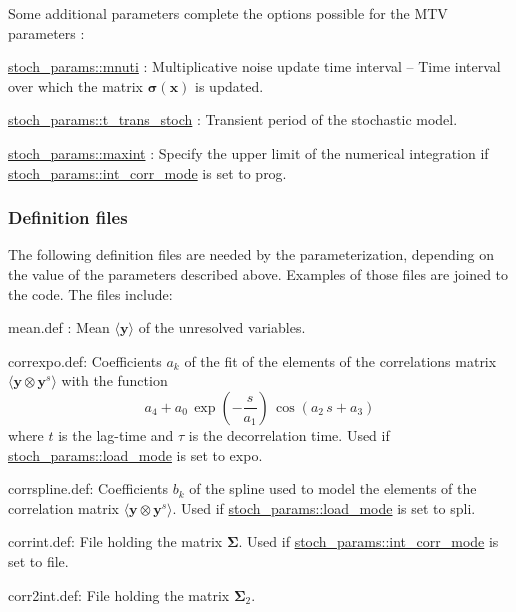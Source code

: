 Some additional parameters complete the options possible for the M\+TV parameters \+:
\begin{DoxyItemize}
\item \hyperlink{namespacestoch__params_ab0b8df90daf320dc4f5810eacd7d93e7}{stoch\+\_\+params\+::mnuti} \+: Multiplicative noise update time interval -- Time interval over which the matrix $\boldsymbol\sigma(\boldsymbol x)$ is updated.
\item \hyperlink{namespacestoch__params_a11aa6b888c2b4005aca690fb78e2c785}{stoch\+\_\+params\+::t\+\_\+trans\+\_\+stoch} \+: Transient period of the stochastic model.
\item \hyperlink{namespacestoch__params_a50976593e79387f25e08fef6ce56b30b}{stoch\+\_\+params\+::maxint} \+: Specify the upper limit of the numerical integration if \hyperlink{namespacestoch__params_ab901db3992a4df88db5a67fdd7be6ac6}{stoch\+\_\+params\+::int\+\_\+corr\+\_\+mode} is set to \textquotesingle{}prog\textquotesingle{}.
\end{DoxyItemize}

\subsubsection*{Definition files}

The following definition files are needed by the parameterization, depending on the value of the parameters described above. Examples of those files are joined to the code. The files include\+:
\begin{DoxyItemize}
\item \textquotesingle{}mean.\+def\textquotesingle{} \+: Mean $\langle \boldsymbol y \rangle$ of the unresolved variables.
\item \textquotesingle{}correxpo.\+def\textquotesingle{}\+: Coefficients $a_k$ of the fit of the elements of the correlations matrix $\langle \boldsymbol y \otimes \boldsymbol y^s \rangle$ with the function \[ a_4+a_0 \, \exp\left(-\frac{s}{a_1}\right) \, \cos(a_2 \, s + a_3) \] where $t$ is the lag-\/time and $\tau$ is the decorrelation time. Used if \hyperlink{namespacestoch__params_ac61a48744a1bb015b5148c421837fbe7}{stoch\+\_\+params\+::load\+\_\+mode} is set to \textquotesingle{}expo\textquotesingle{}.
\item \textquotesingle{}corrspline.\+def\textquotesingle{}\+: Coefficients $b_k$ of the spline used to model the elements of the correlation matrix $\langle \boldsymbol y \otimes \boldsymbol y^s \rangle$. Used if \hyperlink{namespacestoch__params_ac61a48744a1bb015b5148c421837fbe7}{stoch\+\_\+params\+::load\+\_\+mode} is set to \textquotesingle{}spli\textquotesingle{}.
\item \textquotesingle{}corrint.\+def\textquotesingle{}\+: File holding the matrix $\boldsymbol\Sigma$. Used if \hyperlink{namespacestoch__params_ab901db3992a4df88db5a67fdd7be6ac6}{stoch\+\_\+params\+::int\+\_\+corr\+\_\+mode} is set to \textquotesingle{}file\textquotesingle{}.
\item \textquotesingle{}corr2int.\+def\textquotesingle{}\+: File holding the matrix $\boldsymbol\Sigma_2$.
\end{DoxyItemize}

